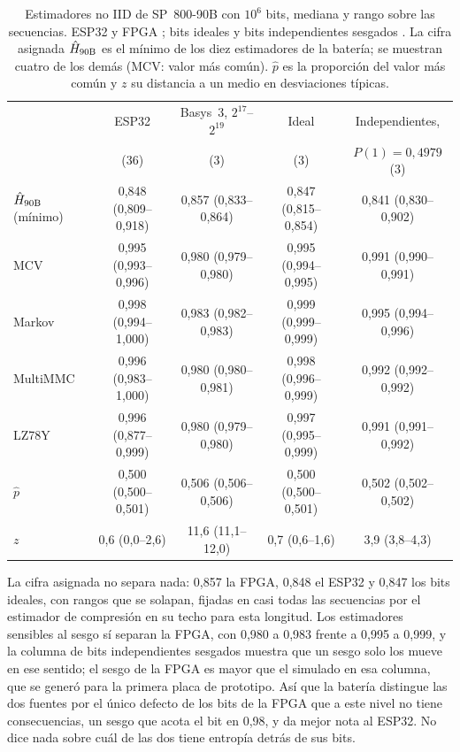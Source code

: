 \begin{table}[htbp]
\centering
\caption{Estimadores no IID de SP~800-90B con $10^6$ bits, mediana y
rango sobre las secuencias. ESP32 y \ac{FPGA} \meas{}; bits ideales y
bits independientes sesgados \simu{}. La cifra asignada $\hat{H}_{\mathrm{90B}}$ es el
mínimo de los diez estimadores de la batería; se muestran cuatro de los
demás (MCV: valor más común). $\hat p$ es la proporción del valor más
común y $z$ su distancia a un medio en desviaciones típicas.}
\label{tab:o8}
\footnotesize
\setlength{\tabcolsep}{3pt}
\begin{tabular}{@{}lcccc@{}}
\toprule
 & ESP32 & Basys~3, $2^{17}$--$2^{19}$ & Ideal & Independientes, \\
 & (36) & (3) & (3) & $P(1) = 0{,}4979$ (3) \\
\midrule
$\hat{H}_{\mathrm{90B}}$ (mínimo) & 0,848 (0,809--0,918) & 0,857 (0,833--0,864) & 0,847 (0,815--0,854) & 0,841 (0,830--0,902) \\
MCV & 0,995 (0,993--0,996) & 0,980 (0,979--0,980) & 0,995 (0,994--0,995) & 0,991 (0,990--0,991) \\
Markov & 0,998 (0,994--1,000) & 0,983 (0,982--0,983) & 0,999 (0,999--0,999) & 0,995 (0,994--0,996) \\
MultiMMC & 0,996 (0,983--1,000) & 0,980 (0,980--0,981) & 0,998 (0,996--0,999) & 0,992 (0,992--0,992) \\
LZ78Y & 0,996 (0,877--0,999) & 0,980 (0,979--0,980) & 0,997 (0,995--0,999) & 0,991 (0,991--0,992) \\
$\hat p$ & 0,500 (0,500--0,501) & 0,506 (0,506--0,506) & 0,500 (0,500--0,501) & 0,502 (0,502--0,502) \\
$z$ & 0,6 (0,0--2,6) & 11,6 (11,1--12,0) & 0,7 (0,6--1,6) & 3,9 (3,8--4,3) \\
\bottomrule
\end{tabular}
\end{table}

La cifra asignada no separa nada: 0,857 la \ac{FPGA}, 0,848 el ESP32 y
0,847 los bits ideales, con rangos que se solapan, fijadas en casi todas
las secuencias por el estimador de compresión en su techo para esta
longitud. Los estimadores
sensibles al sesgo sí separan la \ac{FPGA}, con 0,980 a 0,983 frente a
0,995 a 0,999, y la columna de bits independientes sesgados muestra que
un sesgo solo los mueve en ese sentido; el sesgo de la \ac{FPGA} es mayor
que el simulado en esa columna, que se generó para la primera placa de
prototipo. Así que la batería distingue las dos fuentes por el único
defecto de los bits de la \ac{FPGA} que a este nivel no tiene
consecuencias, un sesgo que acota el bit en 0,98, y da mejor nota al
ESP32. No dice nada sobre cuál de las dos tiene entropía detrás de sus
bits.

